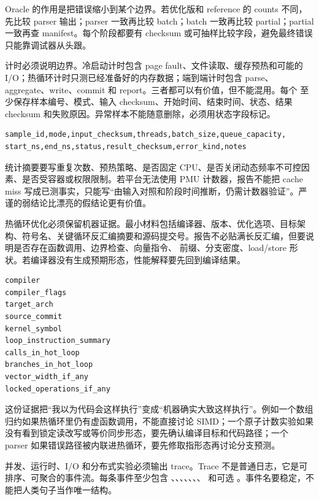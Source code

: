 Oracle 的作用是把错误缩小到某个边界。若优化版和 reference 的 counts 不同，先比较 parser 输出；parser 一致再比较 batch；batch 一致再比较 partial；partial 一致再查 manifest。每个阶段都要有 checksum 或可抽样比较字段，避免最终错误只能靠调试器从头跟。

计时必须说明边界。冷启动计时包含 page fault、文件读取、缓存预热和可能的 I/O；热循环计时只测已经准备好的内存数据；端到端计时包含 parse、aggregate、write、commit 和 report。三者都可以有价值，但不能混用。每个  至少保存样本编号、模式、输入 checksum、开始时间、结束时间、状态、结果 checksum 和失败原因。异常样本不能随意删除，必须用状态字段标记。

\begin{lstlisting}[numbers=none,caption={samples.csv 字段}]
sample_id,mode,input_checksum,threads,batch_size,queue_capacity,
start_ns,end_ns,status,result_checksum,error_kind,notes
\end{lstlisting}

统计摘要要写重复次数、预热策略、是否固定 CPU、是否关闭动态频率不可控因素、是否受容器或权限限制。若平台无法使用 PMU 计数器，报告不能把 cache miss 写成已测事实，只能写“由输入对照和阶段时间推断，仍需计数器验证”。严谨的弱结论比漂亮的假结论更有价值。

热循环优化必须保留机器证据。最小材料包括编译器、版本、优化选项、目标架构、符号名、关键循环反汇编摘要和源码提交号。报告不必贴满长反汇编，但要说明是否存在函数调用、边界检查、向量指令、 前缀、分支密度、load/store 形状。若编译器没有生成预期形态，性能解释要先回到编译结果。

\begin{lstlisting}[numbers=none,caption={disasm.txt 摘要字段}]
compiler
compiler_flags
target_arch
source_commit
kernel_symbol
loop_instruction_summary
calls_in_hot_loop
branches_in_hot_loop
vector_width_if_any
locked_operations_if_any
\end{lstlisting}

这份证据把“我以为代码会这样执行”变成“机器确实大致这样执行”。例如一个数组归约如果热循环里仍有虚函数调用，不能直接讨论 SIMD；一个原子计数实验如果没有看到锁定读改写或等价同步形态，要先确认编译目标和代码路径；一个 parser 如果错误路径被内联进热循环，要先修取指形态再讨论分支预测。

并发、运行时、I/O 和分布式实验必须输出 trace。Trace 不是普通日志，它是可排序、可聚合的事件流。每条事件至少包含 、、、、、、、 和可选 。事件名要稳定，不能把人类句子当作唯一结构。

